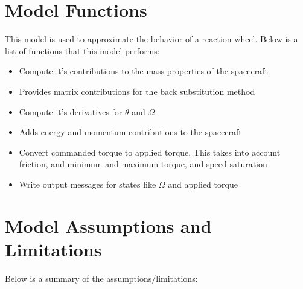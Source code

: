 \section{Model Functions}

This model is used to approximate the behavior of a reaction wheel. Below is a list of functions that this model performs:

\begin{itemize}
	\item Compute it's contributions to the mass properties of the spacecraft
	\item Provides matrix contributions for the back substitution method
	\item Compute it's derivatives for $\theta$ and $\Omega$
	\item Adds energy and momentum contributions to the spacecraft
	\item Convert commanded torque to applied torque. This takes into account friction, and minimum and maximum torque, and speed saturation
	\item Write output messages for states like $\Omega$ and applied torque
\end{itemize}

\section{Model Assumptions and Limitations}
Below is a summary of the assumptions/limitations:

